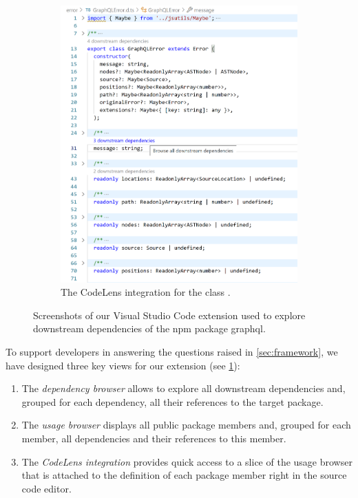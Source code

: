 \begin{figure}[b]
\begin{subfigure}{.32\linewidth}
		\includegraphics[width=\textwidth]{sections/6_implementation/extension/codelens.png}
		\caption[LoF entry]{The CodeLens integration for the class .}
	\end{subfigure}

	\caption{Screenshots of our Visual Studio Code extension used to explore downstream dependencies of the npm package graphql.}
	\label{fig:implementation/presentation/screenshots}
\end{figure}

To support developers in answering the questions raised in \cref{sec:framework}, we have designed three key views for our extension (see \cref{fig:implementation/presentation/screenshots}):

\begin{enumerate}[label=(\roman*)]
	\item The \emph{dependency browser} allows to explore all downstream dependencies and, grouped for each dependency, all their references to the target package.
	\item The \emph{usage browser} displays all public package members and, grouped for each member, all dependencies and their references to this member.
	\item The \emph{CodeLens integration} provides quick access to a slice of the usage browser that is attached to the definition of each package member right in the source code editor.
\end{enumerate}

